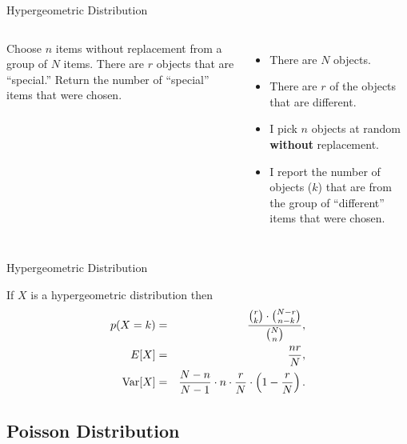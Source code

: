\begin{frame}{Hypergeometric Distribution}

  \begin{columns}
    \begin{definition}
      Choose $n$ items without replacement from a group of $N$
      items. There are $r$ objects that are ``special.'' Return the
      number of ``special'' items that were chosen.
    \end{definition}
    \begin{itemize}
    \item There are $N$ objects.
    \item There are $r$ of the objects that are different.
    \item I pick $n$ objects at random \textbf{without} replacement.
    \item I report the number of objects ($k$) that are from the group
      of ``different'' items that were chosen.
    \end{itemize}
  \end{columns}
  \vfill


\end{frame}

\begin{frame}{Hypergeometric Distribution}


  \begin{definition}
    If $X$ is a hypergeometric distribution then
    \begin{eqnarray*}
      p(X=k) & = & \frac{{r \choose k}\cdot{{N-r}\choose{n-k}}}{{N \choose n}}, \\
      E[X] & = & \frac{nr}{N}, \\
      \mathrm{Var}[X] & = & \frac{N-n}{N-1} \cdot n \cdot \frac{r}{N} \cdot \left( 1-\frac{r}{N}\right).
    \end{eqnarray*}
  \end{definition}

\end{frame}


\subsection{Poisson Distribution}

